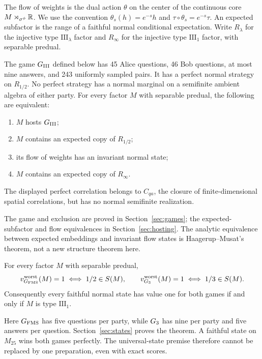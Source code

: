 The flow of weights is the dual action $\theta$ on the center of the continuous core $M\rtimes_{\sigma^\phi}\mathbb R$. We use the convention $\theta_s(h)=e^{-s}h$ and $\tau\circ\theta_s=e^{-s}\tau$. An expected subfactor is the range of a faithful normal conditional expectation. Write $R_\lambda$ for the injective type $\mathrm{III}_\lambda$ factor and $R_\infty$ for the injective type $\mathrm{III}_1$ factor, with separable predual.

\begin{theorem}\label{thm:host}
The game $G_{\mathrm{III}}$ defined below has 45 Alice questions, 46 Bob questions, at most nine answers, and 243 uniformly sampled pairs. It has a perfect normal strategy on $R_{1/2}$. No perfect strategy has a normal marginal on a semifinite ambient algebra of either party. For every factor $M$ with separable predual, the following are equivalent:
\begin{enumerate}
\item $M$ hosts $G_{\mathrm{III}}$;
\item $M$ contains an expected copy of $R_{1/2}$;
\item its flow of weights has an invariant normal state;
\item $M$ contains an expected copy of $R_\infty$.
\end{enumerate}
The displayed perfect correlation belongs to $C_{qa}$, the closure of finite-dimensional spatial correlations, but has no normal semifinite realization.
\end{theorem}
The game and exclusion are proved in Section~\ref{sec:games}; the expected-subfactor and flow equivalences in Section~\ref{sec:hosting}. The analytic equivalence between expected embeddings and invariant flow states is Haagerup--Musat's theorem, not a new structure theorem here.

\begin{theorem}\label{thm:two}
For every factor $M$ with separable predual,
\[
 v^{\mathrm{worst}}_{G_{\mathrm{FMS}}}(M)=1\iff 1/2\in S(M),\qquad
 v^{\mathrm{worst}}_{G_3}(M)=1\iff 1/3\in S(M).
\]
Consequently every faithful normal state has value one for both games if and only if $M$ is type $\mathrm{III}_1$.
\end{theorem}
Here $G_{\mathrm{FMS}}$ has five questions per party, while $G_3$ has nine per party and five answers per question. Section~\ref{sec:states} proves the theorem. A faithful state on $M_{25}$ wins both games perfectly. The universal-state premise therefore cannot be replaced by one preparation, even with exact scores.

